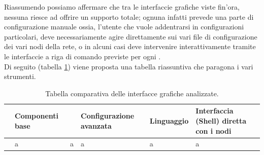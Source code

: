 Riassumendo possiamo affermare che tra le interfaccie grafiche viste fin'ora, nessuna riesce ad offrire un supporto totale; ognuna infatti prevede una parte di configurazione manuale ossia, l'utente che vuole addentrarsi in configurazioni particolari, deve necessariamente agire direttamente sui vari file di configurazione dei vari nodi della rete, o in alcuni casi deve intervenire interattivamente tramite le interfaccie a riga di comando previste per ogni \virtualmachine. \\
Di seguito (tabella \ref{tabella:gui_compare}) viene proposta una tabella riassuntiva che paragona i vari strumenti.

\begin{table}[!htb]
 \begin{center}
	
	\begin{tabular}{||r||*{5}{l|}|}
	\hline
		 		& \textbf{Componenti base} & \textbf{Configurazione base & \textbf{Configurazione avanzata} & \textbf{Linguaggio} & \textbf{Interfaccia (Shell) diretta con i nodi} \\
	\hline
	\hline
	
	\bfseries \visualnetkit		& a & a & a & a & a \\
	\hline
	\end{tabular}

	\caption{Tabella comparativa delle interfacce grafiche analizzate.}
	\label{tabella:gui_compare}
 \end{center}

\end{table}

